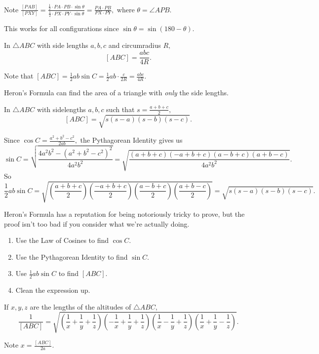 \begin{pro}
Note $\frac{[PAB]}{[PXY]}=\frac{\frac{1}{2}\cdot PA\cdot PB\cdot \sin\theta}{\frac{1}{2}\cdot PX\cdot PY\cdot \sin\theta}=\frac{PA\cdot PB}{PX\cdot PY},$ where $\theta=\angle APB.$

This works for all configurations since $\sin\theta=\sin(180-\theta).$
\end{pro}

\begin{theo}
In $\triangle ABC$ with side lengths $a,b,c$ and circumradius $R,$
\[[ABC]=\frac{abc}{4R}.\]
\end{theo}

\begin{pro}
Note that $[ABC]=\frac{1}{2}ab\sin C=\frac{1}{2}ab\cdot\frac{c}{2R}=\frac{abc}{4R}.$
\end{pro}

Heron's Formula can find the area of a triangle with \textit{only} the side lengths.

\begin{theo}
In $\triangle ABC$ with sidelengths $a,b,c$ such that $s=\frac{a+b+c}{2},$
\[[ABC]=\sqrt{s(s-a)(s-b)(s-c)}.\]
\end{theo}

\begin{pro}
Since $\cos C=\frac{a^2+b^2-c^2}{2ab},$ the Pythagorean Identity gives us \[\sin C=\sqrt{\frac{4a^2b^2-(a^2+b^2-c^2)^2}{4a^2b^2}}=\sqrt{\frac{(a+b+c)(-a+b+c)(a-b+c)(a+b-c)}{4a^2b^2}}.\] So \[\frac{1}{2}ab\sin C=\sqrt{\left(\frac{a+b+c}{2}\right)\left(\frac{-a+b+c}{2}\right)\left(\frac{a-b+c}{2}\right)\left(\frac{a+b-c}{2}\right)}=\sqrt{s(s-a)(s-b)(s-c)}.\]
\end{pro}

Heron's Formula has a reputation for being notoriously tricky to prove, but the proof isn't too bad if you consider what we're actually doing.
\begin{enumerate}
	\item Use the Law of Cosines to find $\cos C.$
	
	\item Use the Pythagorean Identity to find $\sin C.$
	
	\item Use $\frac{1}{2}ab\sin C$ to find $[ABC].$
	
	\item Clean the expression up.
\end{enumerate}

\begin{fact}
If $x,y,z$ are the lengths of the altitudes of $\triangle ABC,$
\[\frac{1}{[ABC]}=\sqrt{\left(\frac{1}{x}+\frac{1}{y}+\frac{1}{z}\right)\left(-\frac{1}{x}+\frac{1}{y}+\frac{1}{z}\right)\left(\frac{1}{x}-\frac{1}{y}+\frac{1}{z}\right)\left(\frac{1}{x}+\frac{1}{y}-\frac{1}{z}\right)}.\]
\begin{hint}
\begin{addhint}
{Note $x=\frac{[ABC]}{2a}.$}
\end{addhint}
\end{hint}
\end{fact}


